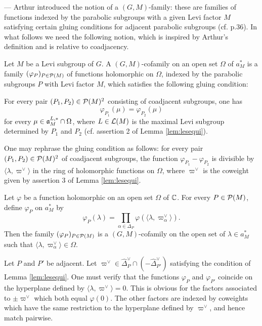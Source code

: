 \begin{paragr} --- Arthur introduced the notion of a $(G,M)$-family: these are families of functions indexed by the parabolic subgroups with a given Levi factor $M$ satisfying certain gluing conditions for adjacent parabolic subgroups (cf. \cite{trace_inv} p.36). In what follows we need the following notion, which is inspired by Arthur's definition and is relative to coadjacency.

\begin{definition}\label{def:cofam}
    Let $M$ be a Levi subgroup of $G$. A $(G,M)$-cofamily on an open set $\Omega$ of $a_M^*$ is a family $(\varphi_P)_{P\in \mathcal{P}(M)}$ of functions holomorphic on $\Omega$, indexed by the parabolic subgroups $P$ with Levi factor $M$, which satisfies the following gluing condition: 

For every pair $(P_1,P_2)\in \mathcal{P}(M)^2$ consisting of coadjacent subgroups, one has 
$$\varphi_{P_1}(\mu)=\varphi_{P_2}(\mu)$$
for every $\mu\in \mathfrak{a}^{L,*}_M\cap \Omega$, where $L\in \mathcal{L}(M)$ is the maximal Levi subgroup determined by $P_1$ and $P_2$ (cf. assertion 2 of Lemma \ref{lem:lesequi}).
\end{definition}

\begin{remarque}
One may rephrase the gluing condition as follows: for every pair $(P_1,P_2)\in \mathcal{P}(M)^2$ of coadjacent subgroups, the function $\varphi_{P_1}-\varphi_{P_2}$ is divisible by $\langle \lambda, \varpi^\vee \rangle$ in the ring of holomorphic functions on $\Omega$, where $\varpi^\vee$ is the coweight given by assertion 3 of Lemma \ref{lem:lesequi}.
\end{remarque}

\begin{lemme}\label{lem:ex} Let $\varphi$ be a function holomorphic on an open set $\Omega$ of $\mathbb{C}$. For every $P\in \mathcal{P}(M)$, define $\varphi_P$ on $a_M^*$ by
$$\varphi_P(\lambda)=\prod_{\alpha\in \Delta_P} \varphi(\langle \lambda, \varpi_\alpha^\vee \rangle).$$
Then the family $(\varphi_P)_{P\in \mathcal{P}(M)}$ is a $(G,M)$-cofamily on the open set of $\lambda\in a_M^*$ such that $\langle \lambda, \varpi_\alpha^\vee \rangle\in \Omega$.
\end{lemme}

\begin{preuve}
   Let $P$ and $P'$ be adjacent. Let $\varpi^\vee \in \hat{\Delta}_P^\vee \cap (-\hat{\Delta}_{P'}^\vee)$ satisfying the condition of Lemma \ref{lem:lesequi}. One must verify that the functions $\varphi_P$ and $\varphi_{P'}$ coincide on the hyperplane defined by $\langle \lambda, \varpi^\vee \rangle=0$. This is obvious for the factors associated to $\pm \varpi^\vee$ which both equal $\varphi(0)$. The other factors are indexed by coweights which have the same restriction to the hyperplane defined by $\varpi^\vee$, and hence match pairwise.
\end{preuve}


\end{paragr}
